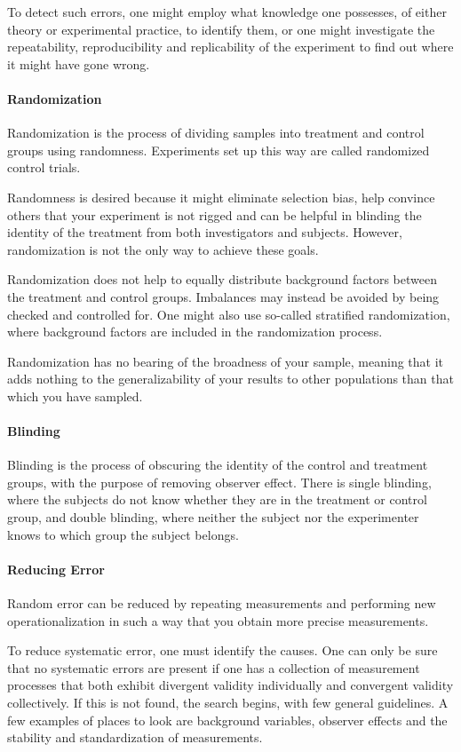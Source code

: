 To detect such errors, one might employ what knowledge one possesses, of either theory or experimental practice, to identify them, or one might investigate the repeatability, reproducibility and replicability of the experiment to find out where it might have gone wrong.

\paragraph{Randomization}
Randomization is the process of dividing samples into treatment and control groups using randomness. Experiments set up this way are called randomized control trials.

Randomness is desired because it might eliminate selection bias, help convince others that your experiment is not rigged and can be helpful in blinding the identity of the treatment from both investigators and subjects. However, randomization is not the only way to achieve these goals.

Randomization does not help to equally distribute background factors between the treatment and control groups. Imbalances may instead be avoided by being checked and controlled for. One might also use so-called stratified randomization, where background factors are included in the randomization process.

Randomization has no bearing of the broadness of your sample, meaning that it adds nothing to the generalizability of your results to other populations than that which you have sampled.

\paragraph{Blinding}
Blinding is the process of obscuring the identity of the control and treatment groups, with the purpose of removing observer effect. There is single blinding, where the subjects do not know whether they are in the treatment or control group, and double blinding, where neither the subject nor the experimenter knows to which group the subject belongs.

\paragraph{Reducing Error}
Random error can be reduced by repeating measurements and performing new operationalization in such a way that you obtain more precise measurements.

To reduce systematic error, one must identify the causes. One can only be sure that no systematic errors are present if one has a collection of measurement processes that both exhibit divergent validity individually and convergent validity collectively. If this is not found, the search begins, with few general guidelines. A few examples of places to look are background variables, observer effects and the stability and standardization of measurements.

